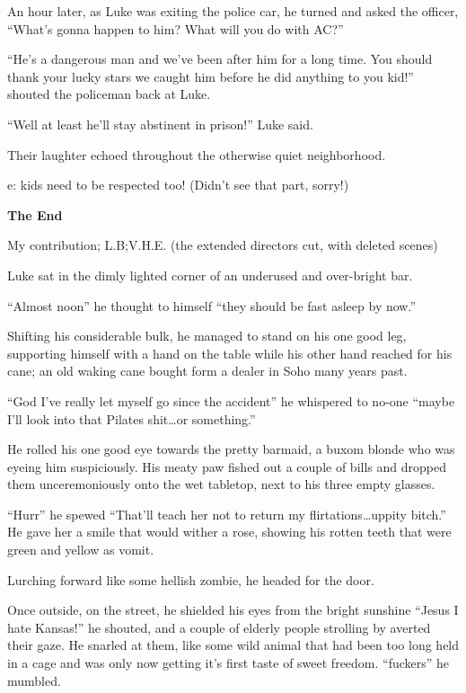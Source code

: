 An hour later, as Luke was exiting the police car, he turned and
asked the officer, ``What's gonna happen to him? What
will you do with AC?''



``He's a dangerous man and we've been after him for a long
time. You should thank your lucky stars we caught him before he did
anything to you kid!'' shouted the policeman back at
Luke.



``Well at least he'll stay abstinent in prison!''
Luke said.



Their laughter echoed throughout the otherwise quiet
neighborhood.



e: kids need to be respected too! (Didn't see that part,
sorry!)

{\bf The End} 
 





My contribution; L.B;V.H.E. (the extended directors cut, with
deleted scenes)



Luke sat in the dimly lighted corner of an underused and
over-bright bar.

``Almost noon'' he thought to himself ``they should be fast asleep by
now.''

Shifting his considerable bulk, he managed to stand on his one good
leg, supporting himself with a hand on the table while his other
hand reached for his cane; an old waking cane bought form a dealer
in Soho many years past.

``God I've really let myself go since the accident'' he whispered to
no-one ``maybe I'll look into that Pilates shit{\ldots}or
something.''

He rolled his one good eye towards the pretty barmaid, a buxom
blonde who was eyeing him suspiciously. His meaty paw fished out a
couple of bills and dropped them unceremoniously onto the wet
tabletop, next to his three empty glasses.

``Hurr'' he spewed ``That'll teach her not to return my
flirtations{\ldots}uppity bitch.'' He gave her a smile that would wither
a rose, showing his rotten teeth that were green and yellow as
vomit.

Lurching forward like some hellish zombie, he headed for the
door.

Once outside, on the street, he shielded his eyes from the bright
sunshine ``Jesus I hate Kansas!'' he shouted, and a couple of elderly
people strolling by averted their gaze. He snarled at them, like
some wild animal that had been too long held in a cage and was only
now getting it's first taste of sweet freedom. ``fuckers'' he
mumbled.

